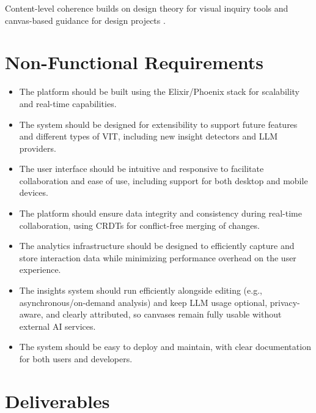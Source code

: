 \documentclass[11pt,a4paper]{article}
\begin{document}
Content-level coherence builds on design theory for visual inquiry tools \citep{avdiji2020design} and canvas-based guidance for design projects \citep{schoormann2023guiding}.

\section{Non-Functional Requirements}

\begin{itemize}
  \item The platform should be built using the Elixir/Phoenix stack for scalability and real-time capabilities.
  \item The system should be designed for extensibility to support future features and different types of VIT, including new insight detectors and LLM providers.
  \item The user interface should be intuitive and responsive to facilitate collaboration and ease of use, including support for both desktop and mobile devices.
  \item The platform should ensure data integrity and consistency during real-time collaboration, using CRDTs for conflict-free merging of changes.
  \item The analytics infrastructure should be designed to efficiently capture and store interaction data while minimizing performance overhead on the user experience.
  \item The insights system should run efficiently alongside editing (e.g., asynchronous/on-demand analysis) and keep LLM usage optional, privacy-aware, and clearly attributed, so canvases remain fully usable without external AI services.
  \item The system should be easy to deploy and maintain, with clear documentation for both users and developers.
\end{itemize}

\section{Deliverables}
\end{document}
